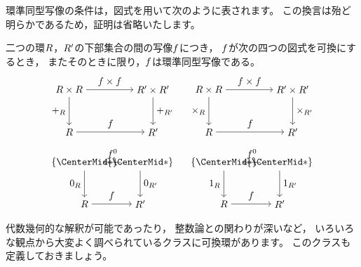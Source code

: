 環準同型写像の条件は，図式を用いて次のように表されます。
この換言は殆ど明らかであるため，証明は省略いたします。
\begin{proposition}
    二つの環\(\Ring\)，\(\Ring'\)の下部集合の間の写像\(\Map\)につき，
    \(\Map\)が次の四つの図式を可換にするとき，
    またそのときに限り，\(\Map\)は環準同型写像である。
    \[
        \begin{tikzpicture}
            \node (A) at (0, 0) {\(\Ring\times\Ring\)};
            \node (B) at (3, 0) {\(\Ring'\times\Ring'\)};
            \node (C) at (0, -1.5) {\(\Ring\)};
            \node (D) at (3, -1.5) {\(\Ring'\)};
            \draw[->] (A) to node[above] {\(\Map\times\Map\)} (B);
            \draw[->] (C) to node[above] {\(\Map\)} (D);
            \draw[->] (A) to node[left] {\(+_{\Ring}\)} (C);
            \draw[->] (B) to node[right] {\(+_{\Ring'}\)} (D);
            \node (E) at (5, 0) {\(\Ring\times\Ring\)};
            \node (F) at (8, 0) {\(\Ring'\times\Ring'\)};
            \node (G) at (5, -1.5) {\(\Ring\)};
            \node (H) at (8, -1.5) {\(\Ring'\)};
            \draw[->] (E) to node[above] {\(\Map\times\Map\)} (F);
            \draw[->] (G) to node[above] {\(\Map\)} (H);
            \draw[->] (E) to node[left] {\(\times_{\Ring}\)} (G);
            \draw[->] (F) to node[right] {\(\times_{\Ring'}\)} (H);
        \end{tikzpicture}
    \]
    \[
        \begin{tikzpicture}
            \node (A) at (0, 0) {\(\Set{\ast}\)};
            \node (B) at (2, 0) {\(\Set{\ast}\)};
            \node (C) at (0, -1.5) {\(\Ring\)};
            \node (D) at (2, -1.5) {\(\Ring'\)};
            \draw[->] (A) to node[above] {\(\Map^0\)} (B);
            \draw[->] (C) to node[above] {\(\Map\)} (D);
            \draw[->] (A) to node[left] {\(0_{\Ring}\)} (C);
            \draw[->] (B) to node[right] {\(0_{\Ring'}\)} (D);
            \node (E) at (5, 0) {\(\Set{\ast}\)};
            \node (F) at (7, 0) {\(\Set{\ast}\)};
            \node (G) at (5, -1.5) {\(\Ring\)};
            \node (H) at (7, -1.5) {\(\Ring'\)};
            \draw[->] (E) to node[above] {\(\Map^0\)} (F);
            \draw[->] (G) to node[above] {\(\Map\)} (H);
            \draw[->] (E) to node[left] {\(1_{\Ring}\)} (G);
            \draw[->] (F) to node[right] {\(1_{\Ring'}\)} (H);
        \end{tikzpicture}
    \]
\end{proposition}

代数幾何的な解釈が可能であったり，
整数論との関わりが深いなど，
いろいろな観点から大変よく調べられているクラスに可換環があります。
このクラスも定義しておきましょう。

